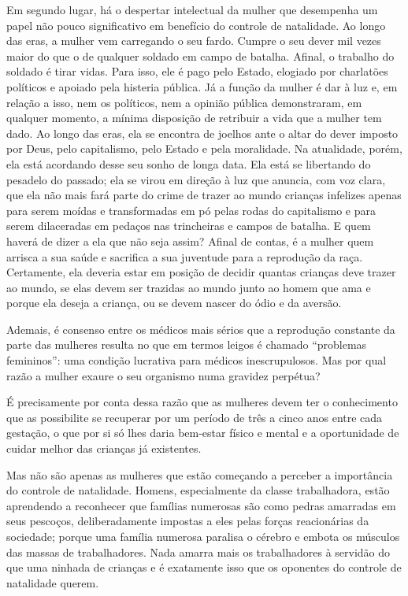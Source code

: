 Em segundo lugar, há o despertar intelectual da mulher que desempenha um
papel não pouco significativo em benefício do controle de natalidade. Ao
longo das eras, a mulher vem carregando o seu fardo. Cumpre o seu dever
mil vezes maior do que o de qualquer soldado em campo de batalha.
Afinal, o trabalho do soldado é tirar vidas. Para isso, ele é pago pelo
Estado, elogiado por charlatões políticos e apoiado pela histeria
pública. Já a função da mulher é dar à luz e, em relação a isso, nem os
políticos, nem a opinião pública demonstraram, em qualquer momento, a
mínima disposição de retribuir a vida que a mulher tem dado. Ao longo
das eras, ela se encontra de joelhos ante o altar do dever imposto por
Deus, pelo capitalismo, pelo Estado e pela moralidade. Na atualidade,
porém, ela está acordando desse seu sonho de longa data. Ela está se
libertando do pesadelo do passado; ela se virou em direção à luz que
anuncia, com voz clara, que ela não mais fará parte do crime de trazer
ao mundo crianças infelizes apenas para serem moídas e transformadas em
pó pelas rodas do capitalismo e para serem dilaceradas em pedaços nas
trincheiras e campos de batalha. E quem haverá de dizer a ela que não
seja assim? Afinal de contas, é a mulher quem arrisca a sua saúde e
sacrifica a sua juventude para a reprodução da raça. Certamente, ela
deveria estar em posição de decidir quantas crianças deve trazer ao
mundo, se elas devem ser trazidas ao mundo junto ao homem que ama e
porque ela deseja a criança, ou se devem nascer do ódio e da aversão.

Ademais, é consenso entre os médicos mais sérios que a reprodução
constante da parte das mulheres resulta no que em termos leigos é
chamado ``problemas femininos'': uma condição lucrativa para médicos
inescrupulosos. Mas por qual razão a mulher exaure o seu organismo numa
gravidez perpétua?

É precisamente por conta dessa razão que as mulheres devem ter o
conhecimento que as possibilite se recuperar por um período de três a
cinco anos entre cada gestação, o que por si só lhes daria bem-estar
físico e mental e a oportunidade de cuidar melhor das crianças já
existentes.

Mas não são apenas as mulheres que estão começando a perceber a
importância do controle de natalidade. Homens, especialmente da classe
trabalhadora, estão aprendendo a reconhecer que famílias numerosas são
como pedras amarradas em seus pescoços, deliberadamente impostas a eles
pelas forças reacionárias da sociedade; porque uma família numerosa
paralisa o cérebro e embota os músculos das massas de trabalhadores.
Nada amarra mais os trabalhadores à servidão do que uma ninhada de
crianças e é exatamente isso que os oponentes do controle de natalidade
querem.

